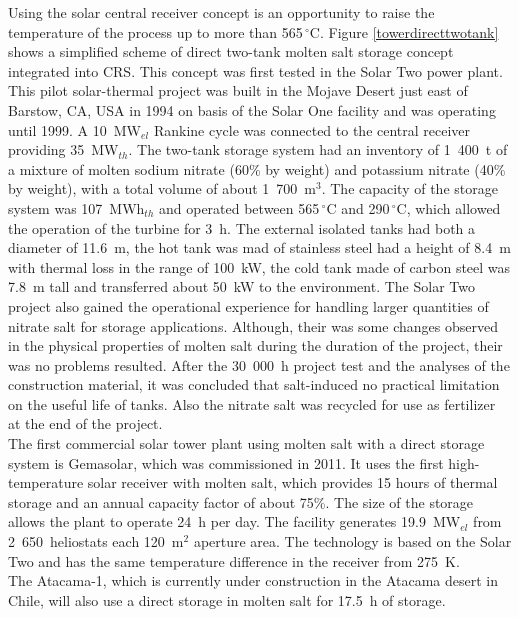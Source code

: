 \documentclass[Master,MEE,english]{twbook}%
\begin{document}
Using the solar central receiver concept is an opportunity to raise the temperature of the process up to more than 565$\,^{\circ}\mathrm{C}$. Figure \ref{towerdirecttwotank}  shows a simplified scheme of direct two-tank molten salt storage concept integrated into CRS. This concept was first tested in the Solar Two power plant. This pilot solar-thermal project was built in the Mojave Desert just east of Barstow, CA, USA in 1994 on basis of the Solar One facility and was operating until 1999. A 10~MW$_{el}$ Rankine cycle was connected to the central receiver providing 35~MW$_{th}$. The two-tank storage system had an inventory of 1~400~t of a mixture of molten sodium nitrate (60\% by weight) and potassium nitrate (40\% by weight), with a total volume of about 1~700~m$^3$. The capacity of the storage system was 107~MWh$_{th}$ and operated between 565$\,^{\circ}\mathrm{C}$ and 290$\,^{\circ}\mathrm{C}$, which allowed the operation of the turbine for 3~h. The external isolated tanks had both a diameter of 11.6~m, the hot tank was mad of stainless steel had a height of 8.4~m with thermal loss in the range of 100~kW, the cold tank made of carbon steel was 7.8~m tall and transferred about 50~kW to the environment. The Solar Two project also gained the operational experience for handling larger quantities of nitrate salt for storage applications. Although, their was some changes observed in the physical properties of molten salt during the duration of the project, their was no problems resulted. After the 30~000~h project test and the analyses of the construction material, it was concluded that salt-induced no practical limitation on the useful life of tanks. Also the nitrate salt was recycled for use as fertilizer at the end of the project. \cite{Steinmann2015} \\
The first commercial solar tower plant using molten salt with a direct storage system is Gemasolar, which was commissioned in 2011. It uses the first high-temperature solar receiver with molten salt, which provides 15 hours of thermal storage and an annual capacity factor of about 75\%. The size of the storage allows the plant to operate 24~h per day. The facility generates 19.9~MW$_{el}$ from 2~650~heliostats each 120~m$^2$ aperture area. The technology is based on the Solar Two and has the same temperature difference in the receiver from 275~K. \cite{NREL2011}\\
The Atacama-1, which is currently under construction in the Atacama desert in Chile, will also use a direct storage in molten salt for 17.5~h of storage. \cite{NREL2015b,AbengoaSolar2015a,AbengoaSolar2015}\\
\end{document}
